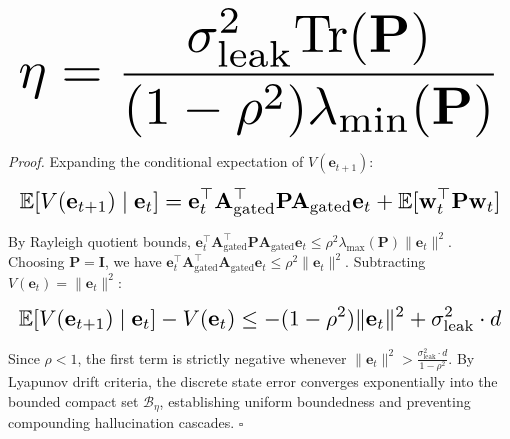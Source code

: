 \documentclass[10pt,twocolumn,letterpaper]{article}
\begin{document}
\begin{equation}
\resizebox{\columnwidth}{!}{$\displaystyle
\begin{aligned}
\eta = \frac{\sigma_{\text{leak}}^2 \text{Tr}(\mathbf{P})}{(1 - \rho^2) \lambda_{\min}(\mathbf{P})}
\end{aligned}
$}
\end{equation}





\textit{Proof.} Expanding the conditional expectation of $V(\mathbf{e}_{t+1})$:





\begin{equation}
\resizebox{\columnwidth}{!}{$\displaystyle
\begin{aligned}
\mathbb{E}[V(\mathbf{e}_{t+1}) \mid \mathbf{e}_t] = \mathbf{e}_t^\top \mathbf{A}_{\text{gated}}^\top \mathbf{P} \mathbf{A}_{\text{gated}} \mathbf{e}_t + \mathbb{E}[\mathbf{w}_t^\top \mathbf{P} \mathbf{w}_t]
\end{aligned}
$}
\end{equation}





By Rayleigh quotient bounds, $\mathbf{e}_t^\top \mathbf{A}_{\text{gated}}^\top \mathbf{P} \mathbf{A}_{\text{gated}} \mathbf{e}_t \le \rho^2 \lambda_{\max}(\mathbf{P}) \|\mathbf{e}_t\|^2$. Choosing $\mathbf{P} = \mathbf{I}$, we have $\mathbf{e}_t^\top \mathbf{A}_{\text{gated}}^\top \mathbf{A}_{\text{gated}} \mathbf{e}_t \le \rho^2 \|\mathbf{e}_t\|^2$. Subtracting $V(\mathbf{e}_t) = \|\mathbf{e}_t\|^2$:





\begin{equation}
\resizebox{\columnwidth}{!}{$\displaystyle
\begin{aligned}
\mathbb{E}[V(\mathbf{e}_{t+1}) \mid \mathbf{e}_t] - V(\mathbf{e}_t) \le -(1 - \rho^2) \|\mathbf{e}_t\|^2 + \sigma_{\text{leak}}^2 \cdot d
\end{aligned}
$}
\end{equation}





Since $\rho < 1$, the first term is strictly negative whenever $\|\mathbf{e}_t\|^2 > \frac{\sigma_{\text{leak}}^2 \cdot d}{1 - \rho^2}$. By Lyapunov drift criteria, the discrete state error converges exponentially into the bounded compact set $\mathcal{B}_\eta$, establishing uniform boundedness and preventing compounding hallucination cascades. $\square$
\end{document}

